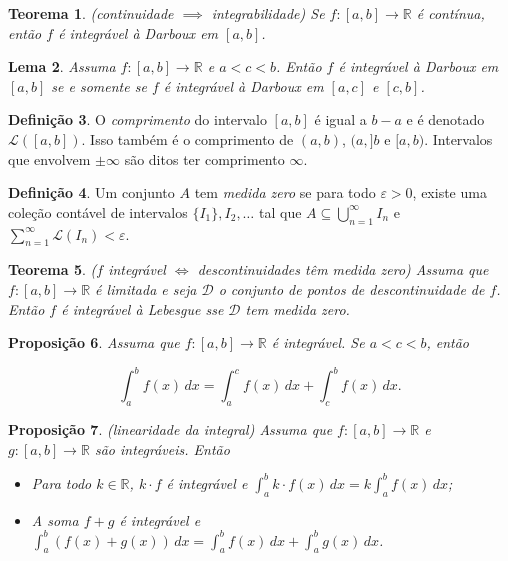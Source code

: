 \documentclass[12pt]{article}
\theoremstyle{plain}
\newtheorem{thm}{Teorema}[section]
\newtheorem{prop}[thm]{Proposição}
\newtheorem{lem}[thm]{Lema}
\theoremstyle{definition}
\newtheorem{defn}[thm]{Definição}
\theoremstyle{remark}
\begin{document}
\begin{thm} (continuidade \(\implies\) integrabilidade)
    Se \(f : [a,b] \to \mathbb{R}\) é contínua, então \(f\) é integrável à Darboux em \([a,b]\).
\end{thm}

\begin{lem}
    Assuma \(f : [a,b] \to \mathbb{R}\) e \(a<c<b\). Então \(f\) é integrável à Darboux em \([a,b]\) se e somente se \(f\) é integrável à Darboux em \([a,c]\) e \([c,b]\).
\end{lem}

\begin{defn}
    O \emph{comprimento} do intervalo \([a,b]\) é igual a \(b-a\) e é denotado \(\mathcal{L}([a,b])\). Isso também é o comprimento de \((a,b)\), \((a,]b\) e \([a,b)\). Intervalos que envolvem \(\pm\infty\) são ditos ter comprimento \(\infty\).
\end{defn}

\begin{defn}
    Um conjunto \(A\) tem \emph{medida zero} se para todo \(\varepsilon > 0\), existe uma coleção contável de intervalos \(\{I_1\}, I_2, \ldots\) tal que \(A \subseteq \bigcup_{n=1}^{\infty} I_n\) e \(\sum_{n=1}^{\infty} \mathcal{L}(I_n) < \varepsilon\).
\end{defn}

\begin{thm} (\(f\) integrável \(\iff\) descontinuidades têm medida zero)
    Assuma que \(f : [a,b] \to \mathbb{R}\) é limitada e seja \(\mathcal{D}\) o conjunto de pontos de descontinuidade de \(f\). Então \(f\) é integrável à Lebesgue sse \(\mathcal{D}\) tem medida zero.
\end{thm}

\begin{prop}
    Assuma que \(f: [a,b] \to \mathbb{R}\) é integrável. Se \(a<c<b\), então

    \begin{equation}
        \int_a^b f(x) \, dx = \int_a^c f(x) \, dx + \int_c^b f(x) \, dx.
    \end{equation}
\end{prop}

\begin{prop} (linearidade da integral)
    Assuma que \(f: [a,b] \to \mathbb{R}\) e \(g: [a,b] \to \mathbb{R}\) são integráveis. Então

    \begin{itemize}
        \item[(i)] Para todo \(k \in \mathbb{R}\), \(k \cdot f\) é integrável e \(\int_a^b k \cdot f(x) \, dx = k \int_a^b f(x) \, dx\);
        \item[(ii)] A soma \(f + g\) é integrável e \(\int_a^b (f(x) + g(x)) \, dx = \int_a^b f(x) \, dx + \int_a^b g(x) \, dx\).
    \end{itemize}
\end{prop}
\end{document}
